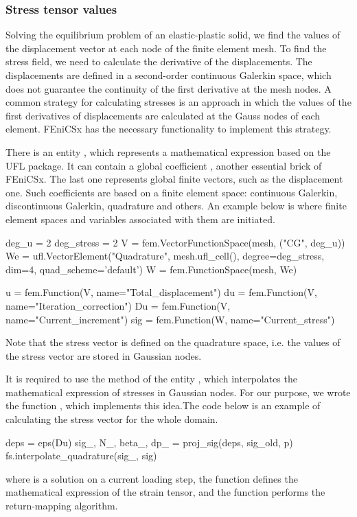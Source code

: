 \documentclass[12pt]{article}
\begin{document}
\subsubsection{Stress tensor values}

Solving the equilibrium problem of an elastic-plastic solid, we find the values of the displacement vector at each node of the finite element mesh. To find the stress field, we need to calculate the derivative of the displacements. The displacements are defined in a second-order continuous Galerkin space, which does not guarantee the continuity of the first derivative at the mesh nodes. A common strategy for calculating stresses is an approach in which the values of the first derivatives of displacements are calculated at the Gauss nodes of each element. FEniCSx has the necessary functionality to implement this strategy. 

There is an entity , which represents a mathematical expression based on the UFL package. It can contain a global coefficient , another essential brick of FEniCSx. The last one represents global finite vectors, such as the displacement one. Such coefficients are based on a finite element space: continuous Galerkin, discontinuous Galerkin, quadrature and others. An example below is where finite element spaces and variables associated with them are initiated.

\begin{pythoncode}
    deg_u = 2
    deg_stress = 2
    V = fem.VectorFunctionSpace(mesh, ("CG", deg_u))
    We = ufl.VectorElement("Quadrature", mesh.ufl_cell(), degree=deg_stress, dim=4, quad_scheme='default')
    W = fem.FunctionSpace(mesh, We)

    u = fem.Function(V, name="Total_displacement")
    du = fem.Function(V, name="Iteration_correction")
    Du = fem.Function(V, name="Current_increment")
    sig = fem.Function(W, name="Current_stress")
\end{pythoncode}
Note that the stress vector  is defined on the quadrature space, i.e. the values of the stress vector are stored in Gaussian nodes. 

It is required to use the  method of the entity , which interpolates the mathematical expression of stresses in Gaussian nodes. For our purpose, we wrote the function , which implements this idea.The code below is an example of calculating the stress vector for the whole domain.
\begin{pythoncode}
    deps = eps(Du)
    sig_, N_, beta_, dp_ = proj_sig(deps, sig_old, p)
    fs.interpolate_quadrature(sig_, sig)
\end{pythoncode}
where  is a solution on a current loading step, the function  defines the mathematical expression of the strain tensor, and the function  performs the return-mapping algorithm.
\end{document}

